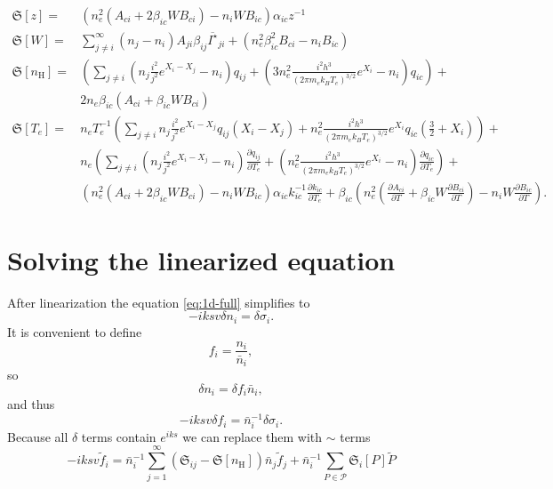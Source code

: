 \documentclass{article}
\begin{document}
\begin{equation}
    \begin{aligned}
        \mathfrak{S}[z] = &(n_e^2(A_{ci} + 2\beta_{ic}WB_{ci}) - n_iWB_{ic})\alpha_{ic}z^{-1}\\
        \mathfrak{S}[W] = &\sum\limits_{j\neq i}^\infty (n_j-n_i)A_{ji}\beta_{ij}\overline{I^\star}_{ji} + (n_e^2\beta_{ic}^2B_{ci} - n_iB_{ic})\\
        \mathfrak{S}[n_\mathrm{H}] = & \left(\sum\limits_{j \neq i}\left(n_j\frac{i^2}{j^2}e^{X_i-X_j}-n_i\right)q_{ij}  + \left(3n_e^2\frac{i^2h^3}{(2\pi m_ek_BT_e)^{3/2}}e^{X_i}-n_i\right)q_{ic}\right) + \\
        &2n_e\beta_{ic}(A_{ci} + \beta_{ic}WB_{ci})\\
        \mathfrak{S}[T_e] = & n_eT_e^{-1}\left(\sum\limits_{j \neq i}n_j\frac{i^2}{j^2}e^{X_i-X_j}q_{ij}(X_i - X_j) + n_e^2\frac{i^2h^3}{(2\pi m_ek_BT_e)^{3/2}}e^{X_i}q_{ic}\left(\frac{3}{2} + X_i\right)\right)+\\
        & n_e\left(\sum\limits_{j \neq i}\left(n_j\frac{i^2}{j^2}e^{X_i-X_j}-n_i\right)\frac{\partial q_{ij}}{\partial T_e}  + \left(n_e^2\frac{i^2h^3}{(2\pi m_ek_BT_e)^{3/2}}e^{X_i}-n_i\right)\frac{\partial q_{ic}}{\partial T_e}\right) + \\
        & (n_e^2(A_{ci} + 2\beta_{ic}WB_{ci}) - n_iWB_{ic})\alpha_{ic}k_{ic}^{-1}\frac{\partial k_{ic}}{\partial T_e} + \beta_{ic}\left(n_e^2\left(\frac{\partial A_{ci}}{\partial T} + \beta_{ic}W\frac{\partial B_{ci}}{\partial T}\right) - n_iW\frac{\partial B_{ic}}{\partial T}\right).
    \end{aligned}
\end{equation}

\section{Solving the linearized equation}

After linearization the equation \eqref{eq:1d-full} simplifies to
\begin{equation}
    -iksv\delta n_i = \delta \sigma_i.
\end{equation}
It is convenient to define 
\[f_i = \frac{n_i}{\bar{n}_i},\]
so
\[\delta n_i = \delta f_i \bar{n}_i,\] 
and thus
\begin{equation}
    -iksv\delta f_i = \bar{n}_i^{-1}\delta \sigma_i.
\end{equation}
Because all \(\delta\) terms contain \(e^{iks}\) we can replace them with \(\sim\) terms
\begin{equation}
    -iksv\tilde{f}_i =  \bar{n}_i^{-1}\sum\limits_{j = 1}^\infty  \left(\mathfrak{S}_{ij}-\mathfrak{S}[n_\mathrm{H}]\right)\bar{n}_j \tilde{f}_j + \bar{n}_i^{-1}\sum\limits_{P \in \mathcal{P}}\mathfrak{S}_i[P]\tilde{P}
\end{equation}
\end{document}
